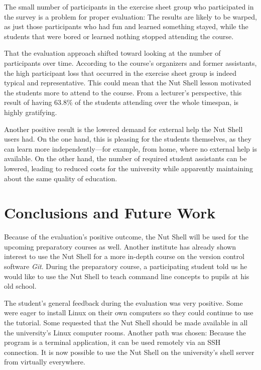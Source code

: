 \documentclass[paper=a4,twoside,abstract=on,cleardoublepage=empty,numbers=noenddot,toc=bib,toc=listof,12pt,appendixprefix=true]{scrreprt}
\begin{document}
The small number of participants in the exercise sheet group who participated in the survey is a problem for proper evaluation: The results are likely to be warped, as just those participants who had fun and learned something stayed, while the students that were bored or learned nothing stopped attending the course.

That the evaluation approach shifted toward looking at the number of participants over time. According to the course's organizers and former assistants, the high participant loss that occurred in the exercise sheet group is indeed typical and representative. This could mean that the Nut Shell lesson motivated the students more to attend to the course. From a lecturer's perspective, this result of having 63.8\% of the students attending over the whole timespan, is highly gratifying.

Another positive result is the lowered demand for external help the Nut Shell users had. On the one hand, this is pleasing for the students themselves, as they can learn more independently---for example, from home, where no external help is available. On the other hand, the number of required student assistants can be lowered, leading to reduced costs for the university while apparently maintaining about the same quality of education.

\chapter{Conclusions and Future Work}
\label{sec:conclusions}

Because of the evaluation's positive outcome, the Nut Shell will be used for the upcoming preparatory courses as well. Another institute has already shown interest to use the Nut Shell for a more in-depth course on the version control software \emph{Git}. During the preparatory course, a participating student told us he would like to use the Nut Shell to teach command line concepts to pupils at his old school.

The student's general feedback during the evaluation was very positive. Some were eager to install Linux on their own computers so they could continue to use the tutorial. Some requested that the Nut Shell should be made available in all the university's Linux computer rooms. Another path was chosen: Because the program is a terminal application, it can be used remotely via an SSH connection. It is now possible to use the Nut Shell on the university's shell server from virtually everywhere.
\end{document}
